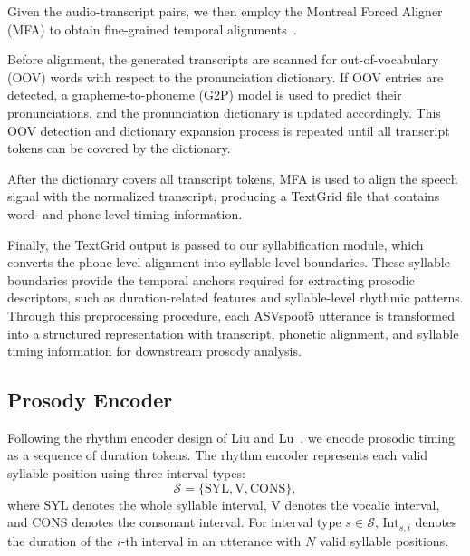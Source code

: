 \documentclass[12pt, a4paper, twocolumn]{article}
\begin{document}
Given the audio-transcript pairs, we then employ the Montreal Forced Aligner (MFA) to obtain fine-grained temporal alignments~\cite{mfa_english_us_arpa_acoustic_2024}.

Before alignment, the generated transcripts are scanned for out-of-vocabulary (OOV) words with respect to the pronunciation dictionary.
If OOV entries are detected, a grapheme-to-phoneme (G2P) model is used to predict their pronunciations, and the pronunciation dictionary is updated accordingly.
This OOV detection and dictionary expansion process is repeated until all transcript tokens can be covered by the dictionary.

After the dictionary covers all transcript tokens, MFA is used to align the speech signal with the normalized transcript, producing a TextGrid file that contains word- and phone-level timing information.

Finally, the TextGrid output is passed to our syllabification module, which converts the phone-level alignment into syllable-level boundaries.
These syllable boundaries provide the temporal anchors required for extracting prosodic descriptors, such as duration-related features and syllable-level rhythmic patterns.
Through this preprocessing procedure, each ASVspoof5 utterance is transformed into a structured representation with transcript, phonetic alignment, and syllable timing information for downstream prosody analysis.

\subsection{Prosody Encoder}
Following the rhythm encoder design of Liu and Lu~\cite{liu2024tone}, we encode
prosodic timing as a sequence of duration tokens. The rhythm encoder represents
each valid syllable position using three interval types:
\begin{equation}
\mathcal{S}=\{\mathrm{SYL},\mathrm{V},\mathrm{CONS}\},
\end{equation}
where \(\mathrm{SYL}\) denotes the whole syllable interval, 
\(\mathrm{V}\) denotes the vocalic interval,
and \(\mathrm{CONS}\) denotes the consonant interval.
For interval type \(s\in\mathcal{S}\), \(\mathrm{Int}_{s,i}\) denotes the duration of the
\(i\)-th interval in an utterance with \(N\) valid syllable positions.
\end{document}
